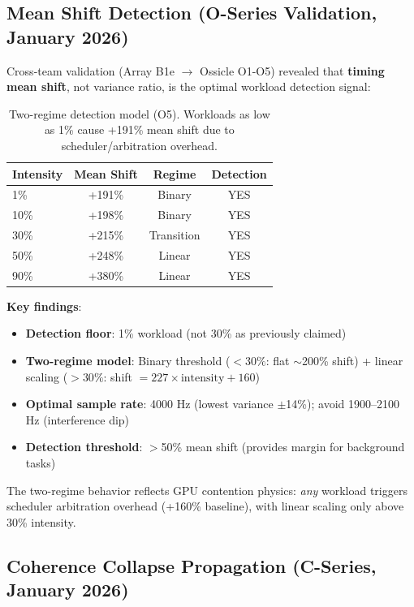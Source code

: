 \documentclass[11pt,a4paper]{article}
\theoremstyle{definition}
\theoremstyle{remark}
\begin{document}
\subsection{Mean Shift Detection (O-Series Validation, January 2026)}

Cross-team validation (Array B1e $\to$ Ossicle O1-O5) revealed that \textbf{timing mean shift}, not variance ratio, is the optimal workload detection signal:

\begin{table}[H]
\centering
\begin{tabular}{lccc}
\toprule
\textbf{Intensity} & \textbf{Mean Shift} & \textbf{Regime} & \textbf{Detection} \\
\midrule
1\% & +191\% & Binary & YES \\
10\% & +198\% & Binary & YES \\
30\% & +215\% & Transition & YES \\
50\% & +248\% & Linear & YES \\
90\% & +380\% & Linear & YES \\
\bottomrule
\end{tabular}
\caption{Two-regime detection model (O5). Workloads as low as 1\% cause +191\% mean shift due to scheduler/arbitration overhead.}
\end{table}

\textbf{Key findings}:
\begin{itemize}
    \item \textbf{Detection floor}: 1\% workload (not 30\% as previously claimed)
    \item \textbf{Two-regime model}: Binary threshold ($<30\%$: flat $\sim$200\% shift) + linear scaling ($>30\%$: shift $= 227 \times \text{intensity} + 160$)
    \item \textbf{Optimal sample rate}: 4000 Hz (lowest variance $\pm$14\%); avoid 1900--2100 Hz (interference dip)
    \item \textbf{Detection threshold}: $>$50\% mean shift (provides margin for background tasks)
\end{itemize}

The two-regime behavior reflects GPU contention physics: \textit{any} workload triggers scheduler arbitration overhead (+160\% baseline), with linear scaling only above 30\% intensity.

\subsection{Coherence Collapse Propagation (C-Series, January 2026)}
\end{document}
